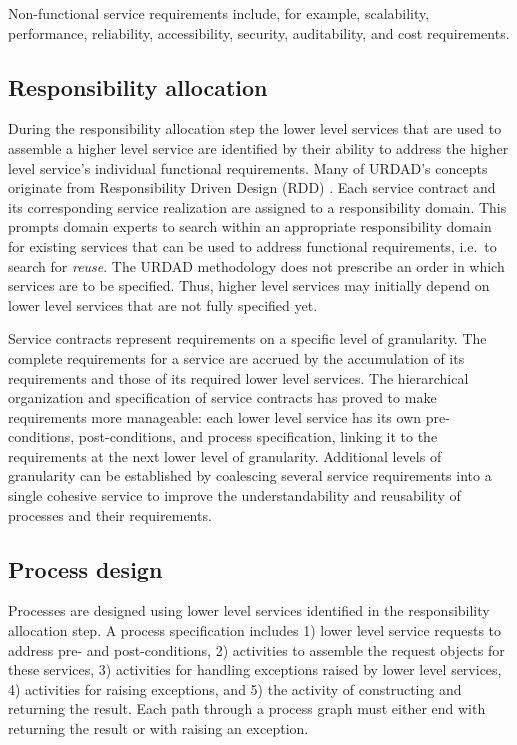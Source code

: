 Non-functional service requirements include, for example, scalability, performance, reliability, accessibility, security, auditability, and cost requirements. 

\subsection{Responsibility allocation}

During the responsibility allocation step the lower level services that are used to assemble a higher level service are identified by their ability to address the higher level service's individual functional requirements. Many of URDAD's concepts originate from Responsibility Driven Design (RDD) \cite{wirfs-brock_object-oriented_1989,wirfs-brock_object_2002}. Each service contract and its corresponding service realization are assigned to a responsibility domain. This prompts domain experts to search within an appropriate responsibility domain for existing services that can be used to address functional requirements, i.e.\ to search for \emph{reuse}. The URDAD methodology does not prescribe an order in which services are to be specified. Thus, higher level services may initially depend on lower level services that are not fully specified yet.

Service contracts represent requirements on a specific level of granularity. The complete requirements for a service are accrued by the accumulation of its requirements and those of its required lower level services. The hierarchical organization and specification of service contracts has proved to make requirements more manageable: each lower level service has its own pre-conditions, post-conditions, and process specification, linking it to the requirements at the next lower level of granularity. Additional levels of granularity can be established by coalescing several service requirements into a single cohesive service to improve the understandability and reusability of processes and their requirements.

\subsection{Process design}

Processes are designed using lower level services identified in the responsibility allocation step. A process specification includes 1) lower level service requests to address pre- and post-conditions, 2) activities to assemble the request objects for these services, 3) activities for handling exceptions raised by lower level services, 4) activities for raising exceptions, and 5) the activity of constructing and returning the result. Each path through a process graph must either end with returning the result or with raising an exception.